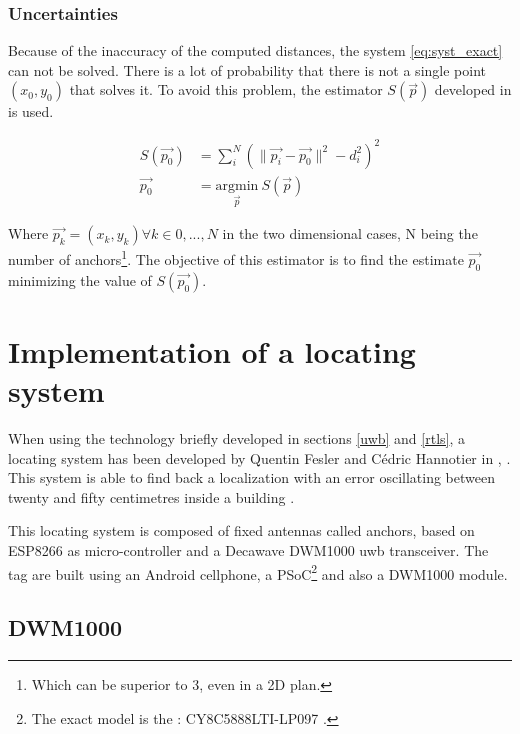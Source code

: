 \subsubsection{Uncertainties}

Because of the inaccuracy of the computed distances, the system \ref{eq:syst_exact} can not be solved. There is a lot of probability that there is not a single point $(x_0, y_0)$ that solves it. To avoid this problem, the estimator $S(\vec{p})$ developed in \cite{zhou2009efficient} is used.

\begin{equation}
\label{eq:syst_approx}
\begin{aligned}
S(\vec{p_0}) &= \sum_i^N (\|\vec{p_i} - \vec{p_0}\| ^2 - d_i^2 )^2 \\
\vec{p_0} &= \underset{\vec{p}}{\text{argmin}}~ S(\vec{p})
\end{aligned}
\end{equation}

Where $\vec{p_k} = (x_k, y_k) \forall k\in {0, ... , N}$ in the two dimensional cases, N being the number of anchors\footnote{Which can be superior to 3, even in a 2D plan.}. The objective of this estimator is to find the estimate $\vec{p_0}$ minimizing the value of $S(\vec{p_0})$.

\section{Implementation of a locating system}
\label{loc_syst}

When using the technology briefly developed in sections \ref{uwb} and \ref{rtls}, a locating system has been developed by Quentin Fesler and Cédric Hannotier in  \cite{fesler2018high}, \cite{hannotier2019indoor}. This system is able to find back a localization with an error oscillating between twenty and fifty centimetres inside a building \cite{guyard2019navigation}.
\vspace{2mm}

This locating system is composed of fixed antennas called anchors, based on ESP8266 as micro-controller and a Decawave DWM1000 \gls{uwb} transceiver\cite{decawave}. The tag are built using an Android cellphone, a PSoC\footnote{The exact model is the : CY8C5888LTI-LP097 \cite{guyard2019navigation}.} and also a DWM1000 module.

\subsection{DWM1000}
\label{dwm1000}

